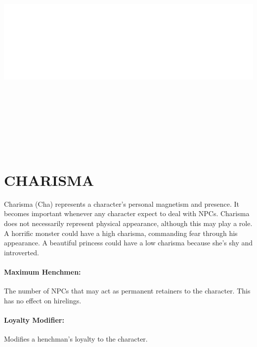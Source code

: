 \begin{multicols}{2}

\noindent\includegraphics[width=\columnwidth, height=4.5in]{testblock.pdf}  
 
\section{CHARISMA}

Charisma (Cha) represents a character's personal magnetism and presence.  It becomes important whenever any character expect to deal with NPCs.  Charisma does not necessarily represent physical appearance, although this may play a role.  A horrific monster could have a high charisma, commanding fear through his appearance.  A beautiful princess could have a low charisma because she's shy and introverted.


\paragraph{Maximum Henchmen:}  The number of NPCs that may act as permanent retainers to the character.  This has no effect on hirelings.

\paragraph{Loyalty Modifier:}  Modifies a henchman's loyalty to the character.  


\end{multicols}
